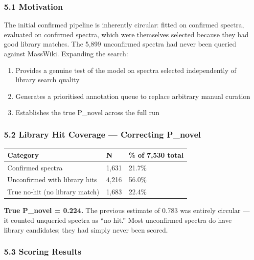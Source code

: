 \subsubsection{5.1 Motivation}\label{motivation}

The initial confirmed pipeline is inherently circular: fitted on
confirmed spectra, evaluated on confirmed spectra, which were themselves
selected because they had good library matches. The 5,899 unconfirmed
spectra had never been queried against MassWiki. Expanding the search:

\begin{enumerate}
\def\labelenumi{\arabic{enumi}.}
\tightlist
\item
  Provides a genuine test of the model on spectra selected independently
  of library search quality
\item
  Generates a prioritised annotation queue to replace arbitrary manual
  curation
\item
  Establishes the true P\_novel across the full run
\end{enumerate}

\subsubsection{5.2 Library Hit Coverage --- Correcting
P\_novel}\label{library-hit-coverage-correcting-p_novel}

{\def\LTcaptype{none} %
\begin{longtable}[]{@{}lll@{}}
\toprule\noalign{}
Category & N & \% of 7,530 total \\
\midrule\noalign{}
\endhead
\bottomrule\noalign{}
\endlastfoot
Confirmed spectra & 1,631 & 21.7\% \\
Unconfirmed with library hits & 4,216 & 56.0\% \\
True no-hit (no library match) & 1,683 & 22.4\% \\
\end{longtable}
}

\textbf{True P\_novel = 0.224.} The previous estimate of 0.783 was
entirely circular --- it counted unqueried spectra as ``no hit.'' Most
unconfirmed spectra do have library candidates; they had simply never
been scored.

\subsubsection{5.3 Scoring Results}\label{scoring-results}

